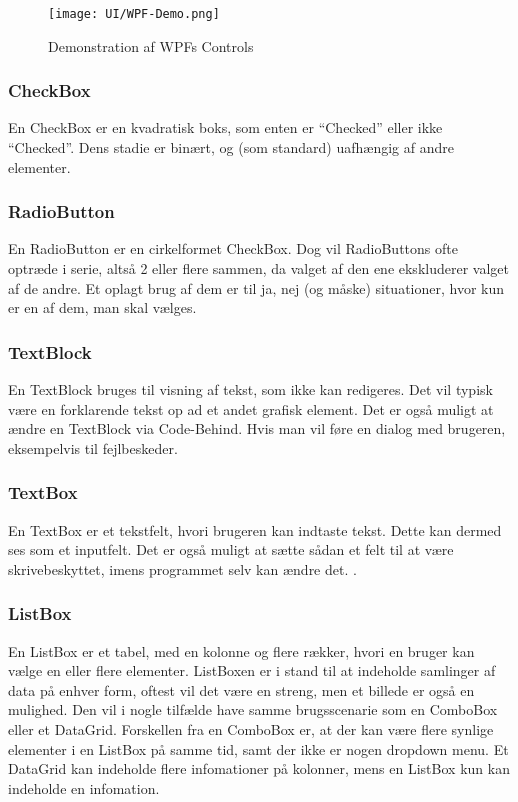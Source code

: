 \begin{wrapfigure}[22]{R}{0.5\textwidth}
    \label{img:wpfdemo}
    \vspace{-30pt}
    \begin{center}
        \texttt{[image: UI/WPF-Demo.png]}
    \end{center}
    \vspace{-15pt}
    \caption{Demonstration af WPFs Controls}
    \vspace{-15pt}
\end{wrapfigure}

\subsubsection*{CheckBox}
En CheckBox er en kvadratisk boks, som enten er ``Checked'' eller ikke ``Checked''. 
Dens stadie er binært, og (som standard) uafhængig af andre elementer.

\subsubsection*{RadioButton}
En RadioButton er en cirkelformet CheckBox.
Dog vil RadioButtons ofte optræde i serie, altså 2 eller flere sammen, da valget af den ene ekskluderer valget af de andre. 
Et oplagt brug af dem er til ja, nej (og måske) situationer, hvor kun er en af dem, man skal vælges.

\subsubsection*{TextBlock}
En TextBlock bruges til visning af tekst, som ikke kan redigeres.
Det vil typisk være en forklarende tekst op ad et andet grafisk element.
Det er også muligt at ændre en TextBlock via Code-Behind. 
Hvis man vil føre en dialog med brugeren, eksempelvis til fejlbeskeder.

\subsubsection*{TextBox}
En TextBox er et tekstfelt, hvori brugeren kan indtaste tekst. 
Dette kan dermed ses som et inputfelt. 
Det er også muligt at sætte sådan et felt til at være skrivebeskyttet, imens programmet selv kan ændre det. .

\subsubsection*{ListBox}
En ListBox er et tabel, med en kolonne og flere rækker, hvori en bruger kan vælge en eller flere elementer.
ListBoxen er i stand til at indeholde samlinger af data på enhver form, oftest vil det være en streng, men et billede er også en mulighed.
Den vil i nogle tilfælde have samme brugsscenarie som en ComboBox eller et DataGrid. 
Forskellen fra en ComboBox er, at der kan være flere synlige elementer i en ListBox på samme tid, samt der ikke er nogen dropdown menu.
Et DataGrid kan indeholde flere infomationer på kolonner, mens en ListBox kun kan indeholde en infomation.


